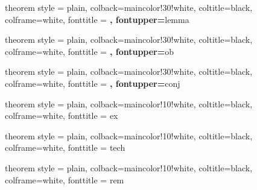  {theorem style = plain, colback=maincolor!30!white, coltitle=black, colframe=white, fonttitle = \upshape\bfseries,  fontupper=\itshape}{lemma}

 {theorem style = plain, colback=maincolor!30!white, coltitle=black, colframe=white, fonttitle = \upshape\bfseries,  fontupper=\itshape}{ob}

 {theorem style = plain, colback=maincolor!30!white, coltitle=black, colframe=white, fonttitle = \upshape\bfseries,  fontupper=\itshape}{conj}

 {theorem style = plain, colback=maincolor!10!white, coltitle=black, colframe=white, fonttitle = \upshape\itshape}{ex}

 {theorem style = plain, colback=maincolor!10!white, coltitle=black, colframe=white, fonttitle = \upshape\itshape}{tech}

 {theorem style = plain, colback=maincolor!10!white, coltitle=black, colframe=white, fonttitle = \upshape\itshape}{rem}

\DeclareMathOperator{\im}{im}
\DeclareMathOperator{\coker}{coker}
\DeclareMathOperator{\cone}{cone}
\DeclareMathOperator{\Tot}{Tot}
\DeclareMathOperator{\Hom}{Hom}
\DeclareMathOperator{\Ext}{Ext}
\DeclareMathOperator{\lExt}{\mathcal{E}\mathit{xt}} %
\DeclareMathOperator{\lHom}{\mathcal{H}\mathit{om}} %
\newcommand{\dL}{\mathbf{L}} %
\newcommand{\dR}{\mathbf{R}} %
\newcommand{\mL}{\mathbb{L}} %
\newcommand{\mR}{\mathbb{R}} %
\DeclareMathOperator{\RHom}{\dR Hom} %
\DeclareMathOperator{\RlHom}{\dR\mathcal{H}\mathit{om}} %
\DeclareMathOperator{\RG}{\dR\Gamma} %
\newcommand{\Lotimes}{\otimes^\dL} %
\newcommand{\lperp}[1]{\prescript{\perp}{}{#1}} %
\DeclareMathOperator{\Spec}{Spec}
\DeclareMathOperator{\Proj}{Proj}
\DeclareMathOperator{\Pic}{Pic}
\DeclareMathOperator{\Coh}{Coh}
\DeclareMathOperator{\QCoh}{QCoh}
\newcommand{\Ab}{\mathrm{Ab}}

\newcommand{\N}{\mathbb{N}}
\newcommand{\Z}{\mathbb{Z}}
\newcommand{\Q}{\mathbb{Q}}
\newcommand{\R}{\mathbb{R}}
\newcommand{\C}{\mathbb{C}}
\newcommand{\A}{\mathbb{A}}
\renewcommand{\P}{\mathbb{P}}
\renewcommand{\O}{\mathcal{O}}
\newcommand{\bbH}{\mathbb{H}}
\newcommand{\calH}{\mathcal{H}}
\newcommand{\calA}{\mathcal{A}}
\newcommand{\calB}{\mathcal{B}}
\newcommand{\calC}{\mathcal{C}}
\newcommand{\calD}{\mathcal{D}}
\newcommand{\calE}{\mathcal{E}}
\newcommand{\calF}{\mathcal{F}}
\newcommand{\calG}{\mathcal{G}}
\newcommand{\calL}{\mathcal{L}}
\newcommand{\calP}{\mathcal{P}}
\newcommand{\calS}{\mathcal{S}}
\newcommand{\calI}{\mathcal{I}}
\newcommand{\calN}{\mathcal{N}}
\newcommand{\calT}{\mathcal{T}}

\newcommand{\id}{\mathrm{id}} %
\newcommand{\pt}{\mathrm{pt}} %
\newcommand{\ev}{\mathrm{ev}} %
\newcommand{\qi}{\mathrm{q.i.}} %

\newcommand{\todo}[1]{{\color{red}\textbf{TODO!: #1}}}
